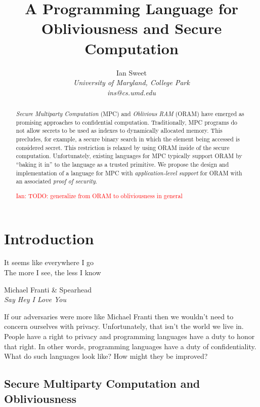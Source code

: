 \documentclass{report}
\newcommand{\ins}[1]{\textcolor{red}{Ian: #1}}
\begin{document}
\title{A Programming Language for Obliviousness and Secure Computation}

\author{Ian Sweet \\
  \emph{University of Maryland, College Park} \\
  \emph{ins@cs.umd.edu}}

\date{}

\maketitle

\begin{abstract}
  \emph{Secure Multiparty Computation} (MPC) and \emph{Oblivious RAM} (ORAM) have emerged as promising approaches to
  confidential computation. Traditionally, MPC programs do not allow secrets to be used as indexes to dynamically
  allocated memory. This precludes, for example, a secure binary search in which the element being accessed is considered secret.
  This restriction is relaxed by using ORAM inside of the secure computation. Unfortunately, existing languages for MPC typically
  support ORAM by ``baking it in'' to the language as a trusted primitive. We propose the design and implementation of a language
  for MPC with \emph{application-level support} for ORAM with an associated \emph{proof of security}.

  \ins{TODO: generalize from ORAM to obliviousness in general}
\end{abstract}

\tableofcontents

\chapter{Introduction}
\label{ch:intro}

\epigraph{It seems like everywhere I go \\
          The more I see, the less I know}{
            Michael Franti \& Spearhead \\
            \emph{Say Hey I Love You}}

If our adversaries were more like Michael Franti then we wouldn't need to concern ourselves with privacy.
Unfortunately, that isn't the world we live in. People have a right to privacy and programming languages have
a duty to honor that right. In other words, programming languages have a duty of confidentiality. What do such
languages look like? How might they be improved?

\section{Secure Multiparty Computation and Obliviousness}
\label{sec:intro}
\end{document}
